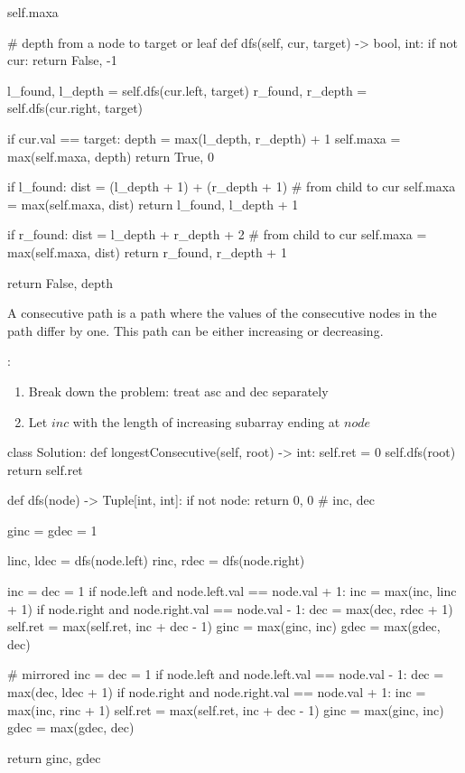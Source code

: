 \begin{python}
self.maxa 

# depth from a node to target or leaf
def dfs(self, cur, target) -> bool, int:
    if not cur:
        return False, -1
    
    l_found, l_depth = self.dfs(cur.left, target)
    r_found, r_depth = self.dfs(cur.right, target)
    
    if cur.val == target:
        depth = max(l_depth, r_depth) + 1
        self.maxa = max(self.maxa, depth)
        return True, 0

    if l_found:
        dist = (l_depth + 1) + (r_depth + 1)   # from child to cur
        self.maxa = max(self.maxa, dist)
        return l_found, l_depth + 1
        
    if r_found:
        dist = l_depth + r_depth + 2  # from child to cur
        self.maxa = max(self.maxa, dist)
        return r_found, r_depth + 1
    
    return False, depth
\end{python}

 A consecutive path is a path where the values of the consecutive nodes in the path differ by one. This path can be either increasing or decreasing.

:
\begin{enumerate}
\item Break down the problem: treat asc and dec separately
\item Let $inc$ with the length of increasing subarray ending at $node$
\end{enumerate}

\begin{python}
class Solution:
  def longestConsecutive(self, root) -> int:
    self.ret = 0
    self.dfs(root)
    return self.ret
  
  def dfs(node) -> Tuple[int, int]:
    if not node:
      return 0, 0  # inc, dec

    ginc = gdec = 1

    linc, ldec = dfs(node.left)
    rinc, rdec = dfs(node.right)

    inc = dec = 1
    if node.left and node.left.val == node.val + 1:
        inc = max(inc, linc + 1)
    if node.right and node.right.val == node.val - 1:
        dec = max(dec, rdec + 1)
    self.ret = max(self.ret, inc + dec - 1)
    ginc = max(ginc, inc)
    gdec = max(gdec, dec)
    
    # mirrored    
    inc = dec = 1
    if node.left and node.left.val == node.val - 1:
        dec = max(dec, ldec + 1)
    if node.right and node.right.val == node.val + 1:
        inc = max(inc, rinc + 1)     
    self.ret = max(self.ret, inc + dec - 1)
    ginc = max(ginc, inc)
    gdec = max(gdec, dec)
    
    return ginc, gdec
\end{python}

